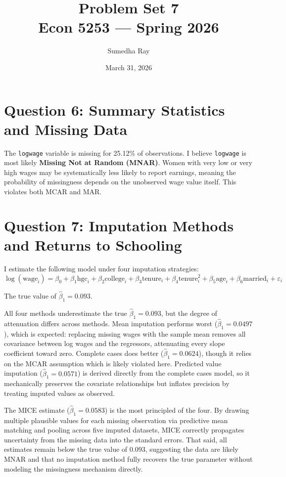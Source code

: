 \documentclass[12pt]{article}
\title{Problem Set 7\\Econ 5253 --- Spring 2026}
\author{Sumedha Ray}
\date{March 31, 2026}
\begin{document}
\maketitle

\section*{Question 6: Summary Statistics and Missing Data}



The \texttt{logwage} variable is missing for 25.12\% of observations.
I believe \texttt{logwage} is most likely \textbf{Missing Not at Random (MNAR)}.
Women with very low or very high wages may be systematically less likely to
report earnings, meaning the probability of missingness depends on the unobserved
wage value itself. This violates both MCAR and MAR.

\section*{Question 7: Imputation Methods and Returns to Schooling}

I estimate the following model under four imputation strategies:
\begin{equation}
\log(\text{wage}_i) = \beta_0 + \beta_1 \text{hgc}_i + \beta_2 \text{college}_i
+ \beta_3 \text{tenure}_i + \beta_4 \text{tenure}_i^2
+ \beta_5 \text{age}_i + \beta_6 \text{married}_i + \varepsilon_i
\end{equation}

The true value of $\hat{\beta}_1 = 0.093$.



All four methods underestimate the true $\hat{\beta}_1 = 0.093$, but the
degree of attenuation differs across methods. Mean imputation performs worst
($\hat{\beta}_1 = 0.0497$), which is expected: replacing missing wages with
the sample mean removes all covariance between log wages and the regressors,
attenuating every slope coefficient toward zero. Complete cases does better
($\hat{\beta}_1 = 0.0624$), though it relies on the MCAR assumption which is
likely violated here. Predicted value imputation ($\hat{\beta}_1 = 0.0571$)
is derived directly from the complete cases model, so it mechanically
preserves the covariate relationships but inflates precision by treating
imputed values as observed.

The MICE estimate ($\hat{\beta}_1 = 0.0583$) is the most principled of the
four. By drawing multiple plausible values for each missing observation via
predictive mean matching and pooling across five imputed datasets, MICE
correctly propagates uncertainty from the missing data into the standard
errors. That said, all estimates remain below the true value of 0.093,
suggesting the data are likely MNAR and that no imputation method fully
recovers the true parameter without modeling the missingness mechanism
directly.
\end{document}
